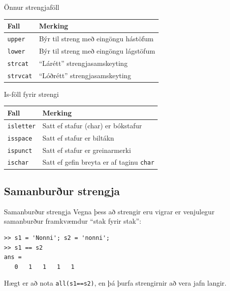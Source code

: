 \documentclass{beamer}
\begin{document}
\begin{frame}[fragile]{Önnur strengjaföll}
\begin{center}
\begin{tabular}{ll}
\toprule
Fall&Merking\\
\midrule
\texttt{upper}&Býr til streng með eingöngu hástöfum\\
\texttt{lower}&Býr til streng með eingöngu lágstöfum\\
\texttt{strcat}&``Lárétt'' strengjasamskeyting\\
\texttt{strvcat}&``Lóðrétt'' strengjasamskeyting\\
\bottomrule
\end{tabular}
\end{center}
\end{frame}

\begin{frame}[fragile]{Is-föll fyrir strengi}
\begin{center}
\begin{tabular}{ll}
\toprule
Fall&Merking\\
\midrule
\texttt{isletter}&Satt ef stafur (char) er bókstafur\\
\texttt{isspace}&Satt ef stafur er biltákn\\
\texttt{ispunct}&Satt ef stafur er greinarmerki\\
\texttt{ischar}&Satt ef gefin breyta er af taginu \texttt{char}\\
\bottomrule
\end{tabular}
\end{center}

\end{frame}


\subsection{Samanburður strengja}

\begin{frame}[fragile]{Samanburður strengja}
Vegna þess að strengir eru vigrar er venjulegur samanburður framkvæmdur ``stak fyrir stak'':
\begin{verbatim}
>> s1 = 'Nonni'; s2 = 'nonni';
>> s1 == s2
ans =
   0   1   1   1   1
\end{verbatim}
Hægt er að nota \texttt{all(s1==s2)}, en þá þurfa strengirnir að vera jafn langir.
\end{frame}
\end{document}
